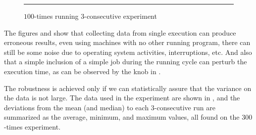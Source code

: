 \begin{figure}
  \centering
  \begin{minipage}[t]{\linewidth}
    \vspace{1em}
    \hrule
    \vspace{1em}
  \end{minipage}
  \caption{$100$-times running $3$-consecutive experiment}
  \label{fig:CProbust}
\end{figure}

The figures  and  show that collecting data from single execution can produce erroneous results, even using machines with no other running program, there can still be some noise due to operating system activities, interruptions, etc. And also that a simple inclusion of a simple job during the running cycle can perturb the execution time, as can be observed by the knob in .

The robustness is achieved only if we can statistically assure that the variance on the data is not large.
The data used in the experiment are shown in , and the deviations from the mean (and median) to each $3$-consecutive run are summarized as the average, minimum, and maximum values, all found on the $300$-times experiment.

